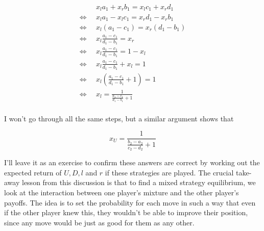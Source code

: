 \documentclass[11pt,]{article}
\begin{document}
\begin{minipage}[t]{0.5\textwidth}
\begin{align*}
&x_la_1 +x_rb_1 = x_lc_1 + x_rd_1 \\
\Leftrightarrow \hspace{6pt} &x_la_1 -x_lc_1 = x_rd_1 - x_rb_1 \\
\Leftrightarrow \hspace{6pt} &x_l(a_1 - c_1) = x_r(d_1 - b_1) \\
\Leftrightarrow \hspace{6pt} &x_l\frac{a_1 - c_1}{d_1 - b_1} = x_r \\
\Leftrightarrow \hspace{6pt} &x_l\frac{a_1 - c_1}{d_1 - b_1} = 1 - x_l \\
\Leftrightarrow \hspace{6pt} &x_l\frac{a_1 - c_1}{d_1 - b_1} + x_l= 1 \\
\Leftrightarrow \hspace{6pt} &x_l(\frac{a_1 - c_1}{d_1 - b_1} + 1)= 1 \\
\Leftrightarrow \hspace{6pt} &x_l= \frac{1}{\frac{a_1 - c_1}{d_1 - b_1} + 1} \\
\end{align*}
\end{minipage}
\begin{minipage}[t]{0.5\textwidth}
\bigskip
I won't go through all the same steps, but a similar argument shows that

$$
x_U = \frac{1}{\frac{b_2 - a_2}{c_2 - d_2}+1}
$$

I'll leave it as an exercise to confirm these answers are correct by working out the expected return of $U, D, l$ and $r$ if these strategies are played.
\bigskip
The crucial take-away lesson from this discussion is that to find a mixed strategy equilibrium, we look at the interaction between one player's mixture and the other player's payoffs. The idea is to set the probability for each move in such a way that even if the other player knew this, they wouldn't be able to improve their position, since any move would be just as good for them as any other.
\end{minipage}
\end{document}
